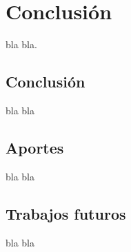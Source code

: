 \chapter{Conclusión}
\label{chap:conc}
\minitoc

bla bla.

\section{Conclusión}

bla bla

\section{Aportes}

bla bla

\section{Trabajos futuros}
bla bla